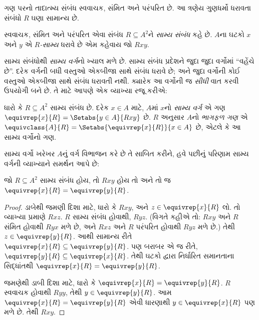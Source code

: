 \begingroup
\makeatletter{}\makeatother


\label{guunit:OLP-0015}


ગણ પરનો તાદાત્મ્ય સંબંધ સ્વવાચક, સંમિત અને પરંપરિત છે.
આ ત્રણેય ગુણધર્મો ધરાવતા સંબંધો $R$ ઘણા સામાન્ય છે.

\begin{defn}[સામ્ય સંબંધ]
સ્વવાચક, સંમિત અને પરંપરિત એવા સંબંધ $R \subseteq A^2$ને
\emph{સામ્ય સંબંધ} કહે છે. $A$ના ઘટકો $x$ અને $y$
એ \emph{$R$-સામ્ય} ધરાવે છે એમ કહેવાય જો $Rxy$.
\end{defn}

સામ્ય સંબંધોથી \emph{સામ્ય વર્ગ}નો ખ્યાલ મળે છે.
સામ્ય સંબંધ પ્રદેશને જુદા જુદા વર્ગોમાં “વહેંચે છે”.
દરેક વર્ગની બધી વસ્તુઓ એકબીજા સાથે સંબંધ ધરાવે છે;
અને જુદા વર્ગોની કોઈ વસ્તુઓ એકબીજા સાથે સંબંધ ધરાવતી નથી.
ક્યારેક આ વર્ગોની જ \emph{સીધી} વાત કરવી ઉપયોગી બને છે.
તે માટે આપણે એક વ્યાખ્યા રજૂ કરીએ:

\begin{defn}
ધારો કે $R \subseteq A^2$ સામ્ય સંબંધ છે. દરેક $x \in A$
માટે, $A$માં $x$નો \emph{સામ્ય વર્ગ} એ ગણ
$\equivrep{x}{R} = \Setabs{y \in A}{Rxy}$ છે.
$R$ અનુસાર $A$નો \emph{ભાગફળ ગણ} એ
$\equivclass{A}{R} = \Setabs{\equivrep{x}{R}}{x \in A}$ છે,
એટલે કે આ સામ્ય વર્ગોનો ગણ.
\end{defn}

સામ્ય વર્ગો ખરેખર $A$નું વર્ગ વિભાજન કરે છે તે સાબિત કરીને,
હવે પછીનું પરિણામ સામ્ય વર્ગની વ્યાખ્યાને સમર્થન આપે છે:

\begin{prop}
જો $R \subseteq A^2$ સામ્ય સંબંધ હોય, તો $Rxy$ હોય
તો અને તો જ $\equivrep{x}{R} = \equivrep{y}{R}$.
\end{prop}

\begin{proof}
ડાબેથી જમણી દિશા માટે, ધારો કે $Rxy$, અને
$z \in \equivrep{x}{R}$ લો. તો વ્યાખ્યા પ્રમાણે $Rxz$.
$R$ સામ્ય સંબંધ હોવાથી, $Ryz$. (વિગતે કહીએ તો:
$Rxy$ અને $R$ સંમિત હોવાથી $Ryx$ મળે છે, અને
$Rxz$ અને $R$ પરંપરિત હોવાથી $Ryz$ મળે છે.)
તેથી $z \in \equivrep{y}{R}$. આથી સામાન્ય રીતે
$\equivrep{x}{R} \subseteq \equivrep{y}{R}$.
પણ બરાબર એ જ રીતે,
$\equivrep{y}{R} \subseteq \equivrep{x}{R}$.
તેથી ઘટકો દ્વારા નિર્ધારિત સમાનતાના સિદ્ધાંતથી
$\equivrep{x}{R} = \equivrep{y}{R}$.

જમણેથી ડાબી દિશા માટે, ધારો કે
$\equivrep{x}{R} = \equivrep{y}{R}$.
$R$ સ્વવાચક હોવાથી $Ryy$, તેથી $y \in \equivrep{y}{R}$.
આમ $\equivrep{x}{R} = \equivrep{y}{R}$ એવી ધારણાથી
$y \in \equivrep{x}{R}$ પણ મળે છે. તેથી $Rxy$.
\end{proof}

